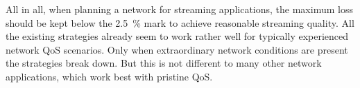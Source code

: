 All in all, when planning a network for streaming applications, the maximum loss should be kept below the \SI{2.5}{\percent} mark to achieve reasonable streaming quality. All the existing strategies already seem to work rather well for typically experienced network \gls{QoS} scenarios. Only when extraordinary network conditions are present the strategies break down. But this is not different to many other network applications, which work best with pristine \gls{QoS}.








